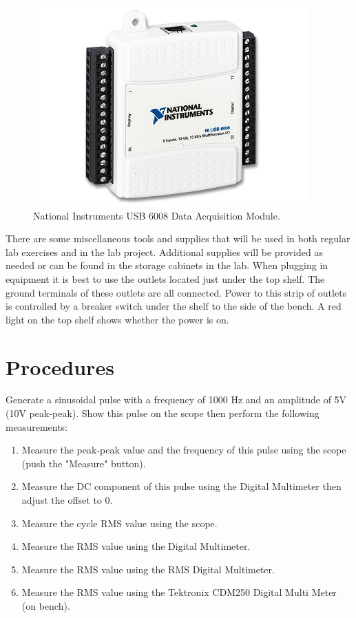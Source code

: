 \documentclass[11pt,letterpaper]{article}
\begin{document}
\begin{figure}
\centering
\includegraphics[width=0.7\linewidth]{Lab2_NationalInstrumentsUSB6009}
\caption{National Instruments USB 6008 Data Acquisition Module.}
\label{fig:Lab2_NationalInstrumentsUSB6009}
\end{figure}

There are some miscellaneous tools and supplies that will be used in both regular lab exercises and in the lab project.  Additional supplies will be provided as needed or can be found in the storage cabinets in the lab. When plugging in equipment it is best to use the outlets located just under the top shelf.  The ground terminals of these outlets are all connected. Power to this strip of outlets is controlled by a breaker switch under the shelf to the side of the bench.  A red light on the top shelf shows whether the power is on.

\section{Procedures}

Generate a sinusoidal pulse with a frequency of 1000 Hz and an amplitude of 5V (10V peak-peak). Show this pulse on the scope then perform the following measurements:

\begin{enumerate}
\item Measure the peak-peak value and the frequency of this pulse using the scope (push the "Measure" button).
\item Measure the DC component of this pulse using the Digital Multimeter then adjust the offset to 0.
\item Measure the cycle RMS value using the scope.
\item Measure the RMS value using the Digital Multimeter.
\item Measure the RMS value using the RMS Digital Multimeter.
\item Measure the RMS value using the Tektronix CDM250 Digital Multi Meter (on bench).
\end{enumerate}
\end{document}
